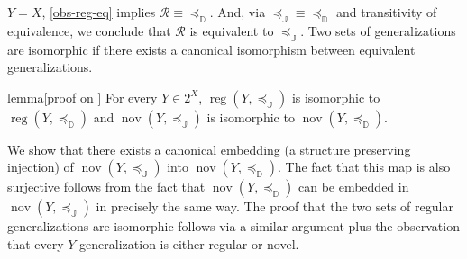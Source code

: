 \documentclass[ecta,nameyear,draft]{econsocart}
\newcommand{\reg}{\operatorname{reg}}
\newcommand{\nov}{\operatorname{nov}}
\newcommand{\mc}{\mathcal}
\newcommand{\preceqb}{\mathbin{\preceq}}
\newcommand{\ext}{\mathrel{\mc R}}
\newcommand{\extb}{\mathbin{\mc R}}
\newcommand{\mbbd}{{\mathds D}}
\newcommand{\mbbj}{\mathds J}
\theoremstyle{plain}
\theoremstyle{remark}
\begin{document}
\begin{appendix}
  $Y=X$, \cref{obs-reg-eq} implies $\extb\equiv \preceqb_{\mbbd}$. And, via
  $\preceqb_{\mbbj}\equiv \preceqb_{\mbbd}$ and transitivity of equivalence, we
  conclude that $\ext$ is equivalent to $\preceq_{\mbbj}$.  Two sets of
  generalizations are isomorphic if there exists a canonical isomorphism
  between equivalent generalizations. 
  \begin{theoremEnd}{lemma}[proof on ]
    \label{lem-nov-iso} For every $Y \in 2^{X}$,
    $\reg(Y, \preceqb_{\mbbj})$ is isomorphic to $\reg(Y,\preceqb_{\mbbd})$ and
    $\nov ( Y , \preceqb_{\mbbj} )$ is isomorphic to $\nov ( Y , \preceqb _
    \mbbd )$.
  \end{theoremEnd}
  \begin{proofEnd}%
    \label{proof-nov-iso} We show that there exists a canonical embedding (a
    structure preserving injection) of $\nov ( Y , \preceqb _ \mbbj )$ into
    $\nov ( Y , \preceqb _ \mbbd )$. The fact that this map is also surjective
    follows from the fact that $\nov ( Y , \preceqb _ \mbbd )$ can be embedded
    in $\nov ( Y , \preceqb _ \mbbj )$ in precisely the same way. The proof
    that the two sets of regular generalizations are isomorphic follows via a
    similar argument plus the observation that every $Y$-generalization is
    either regular or novel.


\end{proofEnd}
\end{appendix}
\end{document}
